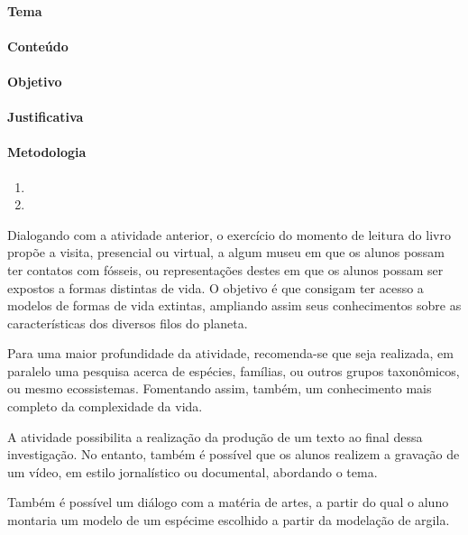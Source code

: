 \documentclass[12pt]{extarticle}
\begin{document}
\paragraph{Tema}

\paragraph{Conteúdo}

\paragraph{Objetivo}

\paragraph{Justificativa}

\paragraph{Metodologia}

\begin{enumerate}

	\item

	\item

\end{enumerate}

Dialogando com a atividade anterior, o exercício do momento de leitura do livro
propõe a visita, presencial ou virtual, a algum museu em que os alunos possam
ter contatos com fósseis, ou representações destes em que os alunos possam ser 
expostos a formas distintas de vida.
O objetivo é que consigam ter acesso a modelos de formas de vida extintas,
ampliando assim seus conhecimentos sobre as características dos diversos filos
do planeta.

Para uma maior profundidade da atividade, recomenda-se que seja realizada, em
paralelo uma pesquisa acerca de espécies, famílias, ou outros grupos
taxonômicos, ou mesmo ecossistemas. Fomentando assim, também, um conhecimento
mais completo da complexidade da vida.

A atividade possibilita a realização da produção de um texto ao final dessa
investigação. No entanto, também é possível que os alunos realizem a gravação
de um vídeo, em estilo jornalístico ou documental, abordando o tema.

Também é possível um diálogo com a matéria de artes, a partir do qual o aluno
montaria um modelo de um espécime escolhido a partir da modelação de argila.
\end{document}
